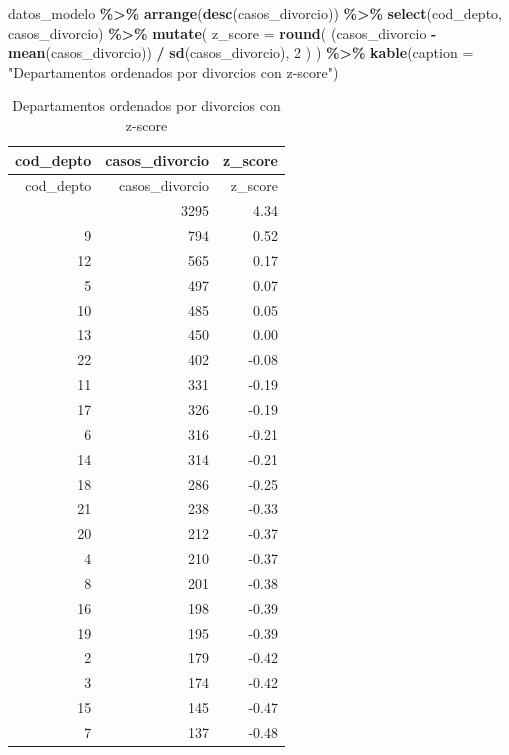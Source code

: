 \documentclass[
]{article}
\newenvironment{Shaded}{\begin{snugshade}}{\end{snugshade}}
\newcommand{\AttributeTok}[1]{\textcolor[rgb]{0.13,0.29,0.53}{#1}}
\newcommand{\DecValTok}[1]{\textcolor[rgb]{0.00,0.00,0.81}{#1}}
\newcommand{\FunctionTok}[1]{\textcolor[rgb]{0.13,0.29,0.53}{\textbf{#1}}}
\newcommand{\NormalTok}[1]{#1}
\newcommand{\SpecialCharTok}[1]{\textcolor[rgb]{0.81,0.36,0.00}{\textbf{#1}}}
\newcommand{\StringTok}[1]{\textcolor[rgb]{0.31,0.60,0.02}{#1}}
\begin{document}
\begin{Shaded}
\begin{Highlighting}[]
\NormalTok{datos\_modelo }\SpecialCharTok{\%\textgreater{}\%}
  \FunctionTok{arrange}\NormalTok{(}\FunctionTok{desc}\NormalTok{(casos\_divorcio)) }\SpecialCharTok{\%\textgreater{}\%}
  \FunctionTok{select}\NormalTok{(cod\_depto, casos\_divorcio) }\SpecialCharTok{\%\textgreater{}\%}
  \FunctionTok{mutate}\NormalTok{(}
    \AttributeTok{z\_score =} \FunctionTok{round}\NormalTok{(}
\NormalTok{      (casos\_divorcio }\SpecialCharTok{{-}} \FunctionTok{mean}\NormalTok{(casos\_divorcio)) }\SpecialCharTok{/} \FunctionTok{sd}\NormalTok{(casos\_divorcio), }\DecValTok{2}
\NormalTok{    )}
\NormalTok{  ) }\SpecialCharTok{\%\textgreater{}\%}
  \FunctionTok{kable}\NormalTok{(}\AttributeTok{caption =} \StringTok{"Departamentos ordenados por divorcios con z{-}score"}\NormalTok{)}
\end{Highlighting}
\end{Shaded}

\begin{longtable}[]{@{}rrr@{}}
\caption{Departamentos ordenados por divorcios con
z-score}\tabularnewline
\toprule\noalign{}
cod\_depto & casos\_divorcio & z\_score \\
\midrule\noalign{}
\endfirsthead
\toprule\noalign{}
cod\_depto & casos\_divorcio & z\_score \\
\midrule\noalign{}
\endhead
\bottomrule\noalign{}
\endlastfoot
1 & 3295 & 4.34 \\
9 & 794 & 0.52 \\
12 & 565 & 0.17 \\
5 & 497 & 0.07 \\
10 & 485 & 0.05 \\
13 & 450 & 0.00 \\
22 & 402 & -0.08 \\
11 & 331 & -0.19 \\
17 & 326 & -0.19 \\
6 & 316 & -0.21 \\
14 & 314 & -0.21 \\
18 & 286 & -0.25 \\
21 & 238 & -0.33 \\
20 & 212 & -0.37 \\
4 & 210 & -0.37 \\
8 & 201 & -0.38 \\
16 & 198 & -0.39 \\
19 & 195 & -0.39 \\
2 & 179 & -0.42 \\
3 & 174 & -0.42 \\
15 & 145 & -0.47 \\
7 & 137 & -0.48 \\
\end{longtable}
\end{document}
